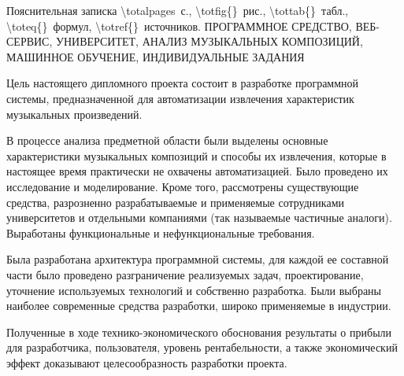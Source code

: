 \thispagestyle{empty}


\begin{center}
	Пояснительная записка \num{\totalpages}~с., \num{\totfig{}}~рис., \num{\tottab{}}~табл., \num{\toteq{}}~формул, \num{\totref{}}~источников.
	\MakeUppercase{Программное средство, веб-сервис, университет, анализ музыкальных композиций, машинное обучение, индивидуальные задания}
\end{center}

Цель настоящего дипломного проекта состоит в разработке программной системы, предназначенной для автоматизации извлечения характеристик музыкальных произведений.

В процессе анализа предметной области были выделены основные характеристики музыкальных композиций и способы их извлечения, которые в настоящее время практически не охвачены автоматизацией. Было проведено их исследование и моделирование. Кроме того, рассмотрены существующие средства, разрозненно разрабатываемые и применяемые сотрудниками университетов и отдельными компаниями (так называемые частичные аналоги). Выработаны функциональные и нефункциональные требования.

Была разработана архитектура программной системы, для каждой ее составной части было проведено разграничение реализуемых задач, проектирование, уточнение используемых технологий и собственно разработка. Были выбраны наиболее современные средства разработки, широко применяемые в индустрии.

Полученные в ходе технико-экономического обоснования результаты о прибыли для разработчика, пользователя, уровень рентабельности, а также экономический эффект доказывают целесообразность разработки проекта.
